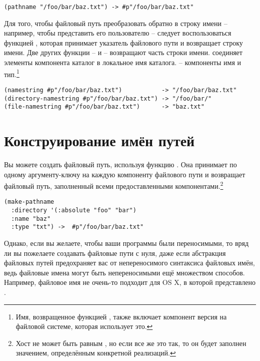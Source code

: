 \begin{lstlisting}
(pathname "/foo/bar/baz.txt") -> #p"/foo/bar/baz.txt" 
\end{lstlisting}

Для того, чтобы файловый путь преобразовать обратно в строку имени -- например, чтобы
представить его пользователю -- следует воспользоваться функцией ,
которая принимает указатель файлового пути и возвращает строку имени. Две других функции
--  и  -- возвращают часть строки
имени.  соединяет элементы компонента каталог в локальное имя
каталога.  -- компоненты имя и тип.\footnote{Имя, возвращенное
  функцией , также включает компонент версия на файловой системе,
  которая использует это.}

\begin{lstlisting}
(namestring #p"/foo/bar/baz.txt")           -> "/foo/bar/baz.txt" 
(directory-namestring #p"/foo/bar/baz.txt") -> "/foo/bar/" 
(file-namestring #p"/foo/bar/baz.txt")      -> "baz.txt" 
\end{lstlisting}

\section{Конструирование имён путей}

Вы можете создать файловый путь, используя функцию . Она принимает по
одному аргументу-ключу на каждую компоненту файлового пути и возвращает файловый путь,
заполненный всеми предоставленными компонентами.\footnote{Хост не может быть равным
  , но если все же это так, то он будет заполнен значением, определённым
  конкретной реализаций.}

\begin{lstlisting}
(make-pathname
  :directory '(:absolute "foo" "bar")
  :name "baz"
  :type "txt") ->  #p"/foo/bar/baz.txt"
\end{lstlisting}

Однако, если вы желаете, чтобы ваши программы были переносимыми, то вряд ли вы пожелаете
создавать файловые пути с нуля, даже если абстракция файловых путей предохраняет вас от
непереносимого синтаксиса файловых имён, ведь файловые имена могут быть непереносимыми ещё
множеством способов. Например, файловое имя  не очень-то
подходит для OS X, в которой  представлено .

